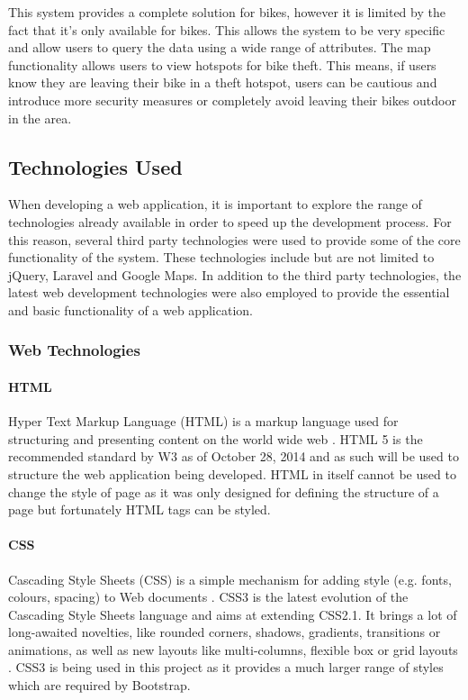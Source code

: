 This system provides a complete solution for bikes, however it is limited by the fact that it's only available for bikes. This allows the system to be very specific and allow users to query the data using a wide range of attributes. The map functionality allows users to view hotspots for bike theft. This means, if users know they are leaving their bike in a theft hotspot, users can be cautious and introduce more security measures or completely avoid leaving their bikes outdoor in the area.

\subsection{Technologies Used}\label{Section:Research_Technologies}
When developing a web application, it is important to explore the range of technologies already available in order to speed up the development process. For this reason, several third party technologies were used to provide some of the core functionality of the system. These technologies include but are not limited to jQuery, Laravel and Google Maps. In addition to the third party technologies, the latest web development technologies were also employed to provide the essential and basic functionality of a web application.

\subsubsection{Web Technologies}\label{Section:Web_Technologies}

\paragraph{HTML} Hyper Text Markup Language (HTML) is a markup language used for structuring and presenting content on the world wide web \cite{W3:HTML5}. HTML 5 is the recommended standard by W3 as of October 28, 2014 and as such will be used to structure the web application being developed. HTML in itself cannot be used to change the style of page as it was only designed for defining the structure of a page but fortunately HTML tags can be styled. 

\paragraph{CSS} Cascading Style Sheets (CSS) is a simple mechanism for adding style (e.g. fonts, colours, spacing) to Web documents \cite{W3:CSS}. CSS3 is the latest evolution of the Cascading Style Sheets language and aims at extending CSS2.1. It brings a lot of long-awaited novelties, like rounded corners, shadows, gradients, transitions or animations, as well as new layouts like multi-columns, flexible box or grid layouts \cite{Mozilla:CSS3}. CSS3 is being used in this project as it provides a much larger range of styles which are required by Bootstrap.

